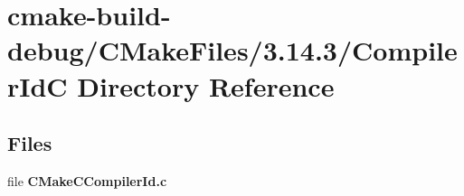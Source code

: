 \section{cmake-\/build-\/debug/\+C\+Make\+Files/3.14.3/\+Compiler\+IdC Directory Reference}
\label{dir_19f2f1b99f19c12fa55b8d312cf373ed}
\subsection*{Files}
\begin{DoxyCompactItemize}
\item 
file {\bf C\+Make\+C\+Compiler\+Id.\+c}
\end{DoxyCompactItemize}

